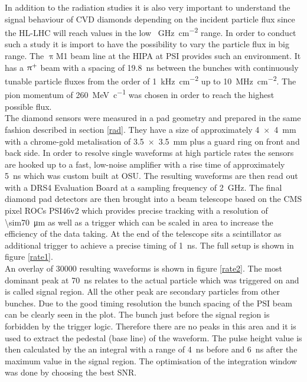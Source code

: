 In addition to the radiation studies it is also very important to understand the signal behaviour of \ac{CVD} diamonds depending on the incident particle flux since the \ac{HL-LHC} will reach values in the low \SI{}{\giga\hertz\per\centi\meter^2} range. In order to conduct such a study it is import to have the possibility to vary the particle flux in big range. The $\uppi$M1 beam line at the \ac{HIPA} at \ac{PSI} provides such an environment. It has a $\uppi^{\text{+}}$ beam with a spacing of \SI{19.8}{\nano\second} between the bunches with continuously tunable particle fluxes from the order of \SI{1}{\kilo\hertz\per\centi\meter^2} up to \SI{10}{\mega\hertz\per\centi\meter^2}. The pion momentum of \SI{260}{\mega\electronvolt\per c} was chosen in order to reach the highest possible flux. \\
The diamond sensors were measured in a pad geometry and prepared in the same fashion
described in section \vref{rad}. They have a size of approximately \SI{4x4}{\milli\meter} with a chrome-gold metalisation of \SI{3.5x3.5}{\milli\meter} plus a guard ring on front and back side. In order to resolve single waveforms at high particle rates the sensors are hooked up to a fast, low-noise amplifier with a rise time of approximately \SI{5}{\nano\second} which was custom built at \ac{OSU}. The resulting waveforms are then read out with a DRS4 Evaluation Board at a sampling frequency of \SI{2}{\giga\hertz}. The final diamond pad detectors are then brought into a beam telescope based on the CMS pixel \acp{ROC} PSI46v2 which provides precise tracking with a resolution of \SI{\sim70}{\micro\meter} as well as a trigger which can be scaled in area to increase the efficiency of the data taking. At the end of the telescope sits a scintillator as additional trigger to achieve a precise timing of \SI{1}{\nano\second}. The full setup is shown in figure \vref{rate1}.\\
An overlay of 30000 resulting waveforms is shown in figure \vref{rate2}. The most dominant peak at \SI{70}{\nano\second} relates to the actual particle which was triggered on and is called signal region. All the other peak are secondary particles from other bunches. Due to the good timing resolution the bunch spacing of the \ac{PSI} beam can be clearly seen in the plot. The bunch just before the signal region is forbidden by the trigger logic. Therefore there are no peaks in this area and it is used to extract the pedestal (base line) of the waveform. The pulse height value is then calculated by the an integral with a range of \SI{4}{\nano\second} before and \SI{6}{\nano\second} after the maximum value in the signal region. The optimisation of the integration window was done by choosing the best \ac{SNR}.\\

